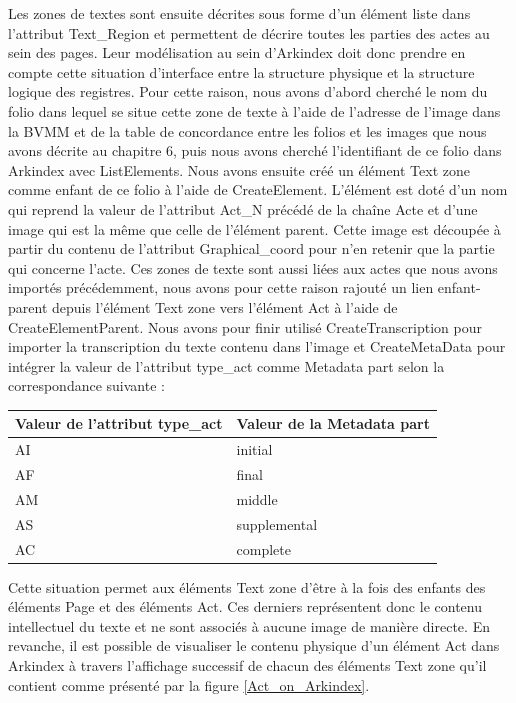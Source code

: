 \documentclass[a4paper,12pt,twoside]{book}
\begin{document}
	Les zones de textes sont ensuite décrites sous forme d'un élément liste dans l'attribut \og Text\_Region\fg{} et permettent de décrire toutes les parties des actes au sein des pages. Leur modélisation au sein d'Arkindex doit donc prendre en compte cette situation d'interface entre la structure physique et la structure logique des registres. Pour cette raison, nous avons d'abord cherché le nom du folio dans lequel se situe cette zone de texte à l'aide de l'adresse de l'image dans la BVMM et de la table de concordance entre les folios et les images que nous avons décrite au chapitre 6, puis nous avons cherché l'identifiant de ce folio dans Arkindex avec ListElements. Nous avons ensuite créé un élément Text zone comme enfant de ce folio à l'aide de CreateElement. L'élément est doté d'un nom qui reprend la valeur de l'attribut \og Act\_N\fg{} précédé de la chaîne \og Acte\fg{} et d'une image qui est la même que celle de l'élément parent. Cette image est découpée à partir du contenu de l'attribut \og Graphical\_coord\fg{} pour n'en retenir que la partie qui concerne l'acte. Ces zones de texte sont aussi liées aux actes que nous avons importés précédemment, nous avons pour cette raison rajouté un lien enfant-parent depuis l'élément Text zone vers l'élément Act à l'aide de CreateElementParent. Nous avons pour finir utilisé CreateTranscription pour importer la transcription du texte contenu dans l'image et CreateMetaData pour intégrer la valeur de l'attribut \og type\_act{} comme Metadata \og part\fg{} selon la correspondance suivante :
	
	\begin{center}
		\begin{tabular}{|p{4cm}|p{4cm}|}
			\hline
			Valeur de l'attribut \og type\_act\fg{} & Valeur de la Metadata \og part\fg{}\\
			\hline\hline
			AI & initial \\ \hline
			AF & final \\ \hline
			AM & middle \\ \hline
			AS & supplemental \\ \hline
			AC & complete \\ \hline
		\end{tabular}
	\end{center}
	
	Cette situation permet aux éléments \og Text zone\fg{} d'être à la fois des enfants des éléments \og Page\fg{} et des éléments \og Act\fg{}. Ces derniers représentent donc le contenu intellectuel du texte et ne sont associés à aucune image de manière directe. En revanche, il est possible de visualiser le contenu physique d'un élément \og Act\fg{} dans Arkindex à travers l'affichage successif de chacun des éléments \og Text zone\fg{} qu'il contient comme présenté par la figure \ref{Act_on_Arkindex}.
	
\end{document}
